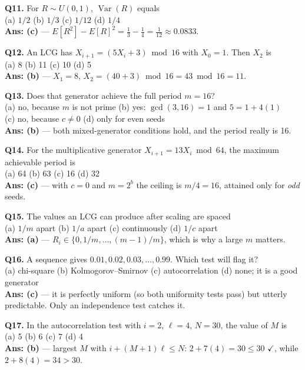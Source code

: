 \begin{mcqbox}
\textbf{Q11.} For $R \sim U(0,1)$, $\operatorname{Var}(R)$ equals\\
(a) $1/2$ \quad (b) $1/3$ \quad (c) $1/12$ \quad (d) $1/4$\\
\textbf{Ans: (c)} --- $E[R^2]-E[R]^2 = \frac13-\frac14 = \frac1{12} \approx 0.0833$.

\textbf{Q12.} An LCG has $X_{i+1} = (5X_i+3)\bmod 16$ with $X_0 = 1$. Then $X_2$ is\\
(a) 8 \quad (b) 11 \quad (c) 10 \quad (d) 5\\
\textbf{Ans: (b)} --- $X_1 = 8$, $X_2 = (40+3)\bmod16 = 43\bmod16 = 11$.

\textbf{Q13.} Does that generator achieve the full period $m = 16$?\\
(a) no, because $m$ is not prime \quad (b) yes: $\gcd(3,16) = 1$ and $5 = 1+4(1)$\\
(c) no, because $c \neq 0$ \quad (d) only for even seeds\\
\textbf{Ans: (b)} --- both mixed-generator conditions hold, and the period really is 16.

\textbf{Q14.} For the multiplicative generator $X_{i+1} = 13X_i \bmod 64$, the maximum achievable period is\\
(a) 64 \quad (b) 63 \quad (c) 16 \quad (d) 32\\
\textbf{Ans: (c)} --- with $c=0$ and $m=2^b$ the ceiling is $m/4 = 16$, attained only for \emph{odd} seeds.

\textbf{Q15.} The values an LCG can produce after scaling are spaced\\
(a) $1/m$ apart \quad (b) $1/a$ apart \quad (c) continuously \quad (d) $1/c$ apart\\
\textbf{Ans: (a)} --- $R_i \in \{0, 1/m, \dots, (m-1)/m\}$, which is why a large $m$ matters.

\textbf{Q16.} A sequence gives $0.01, 0.02, 0.03, \dots, 0.99$. Which test will flag it?\\
(a) chi-square \quad (b) Kolmogorov--Smirnov \quad (c) autocorrelation \quad (d) none; it is a good generator\\
\textbf{Ans: (c)} --- it is perfectly uniform (so both uniformity tests pass) but utterly predictable. Only an independence test catches it.

\textbf{Q17.} In the autocorrelation test with $i=2$, $\ell=4$, $N=30$, the value of $M$ is\\
(a) 5 \quad (b) 6 \quad (c) 7 \quad (d) 4\\
\textbf{Ans: (b)} --- largest $M$ with $i+(M+1)\ell \le N$: $2+7(4) = 30 \le 30$ $\checkmark$, while $2+8(4) = 34 > 30$.


\end{mcqbox}
